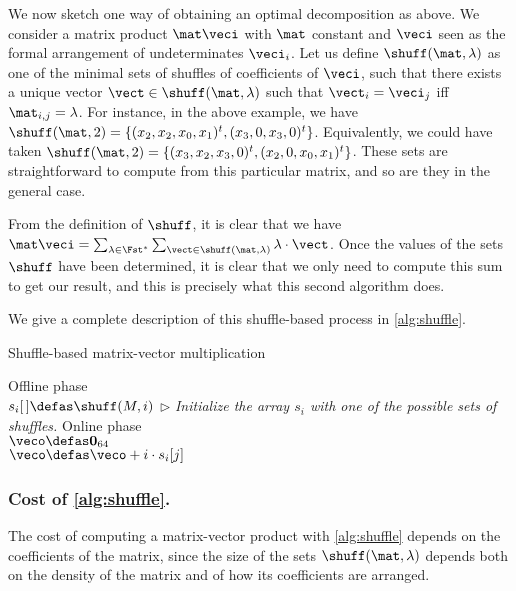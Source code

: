 \medskip

We now sketch one way of obtaining an optimal decomposition as above.
We consider a matrix product $\mat\veci$ with $\mat$ constant and $\veci$
seen as the formal arrangement of undeterminates $\veci_i$.
Let us define $\shuff(\mat, \lambda)$ as one of the minimal sets of shuffles of coefficients of $\veci$, such that
there exists a unique vector $\vect \in \shuff(\mat, \lambda)$ such that $\vect_i = \veci_j$ iff $\mat_{i,j} = \lambda$.
For instance, in the above example, we have $\shuff(\mat,2) = \{(x_2,x_2,x_0,x_1)^t, (x_3,0,x_3,0)^t\}$. Equivalently, we could have taken
$\shuff(\mat, 2) = \{(x_3,x_2,x_3,0)^t, (x_2,0,x_0,x_1)^t\}$.
These sets are straightforward to compute from this particular matrix, and so are they in the general case.

From the definition of $\shuff$, it is clear that we have $\mat\veci = \sum_{\lambda \in \Fst^*}\sum_{\vect \in \shuff(\mat,\lambda)} \lambda\cdot \vect$.
Once the values of the sets $\shuff$ have been determined, it is clear that we only need to compute this sum to get our result, and 
this is precisely what this second algorithm does.

We give a complete description of this shuffle-based process in \autoref{alg:shuffle}.

\begin{algorithm}[!h]
  \caption{Shuffle-based matrix-vector multiplication}
\label{alg:shuffle}
  \LinesNumbered
  \KwOut{  $\veco = \mat\cdot\veci$}
  Offline phase\\
  {
  $s_i[\,] \defas \shuff(M, i)$ $\triangleright$ \emph{Initialize the array $s_i$ with one of the possible sets of shuffles.}
  }
  Online phase\\
  $\veco \defas \mathbf{0}_{64}$\\
  {
  {
  $\veco \defas \veco + i\cdot s_i[j]$
  }
  }
  \Return{$\veco$}
\end{algorithm}

\subsubsection{Cost of \autoref{alg:shuffle}.} The cost of computing a matrix-vector product with \autoref{alg:shuffle} depends
on the coefficients of the matrix, since the size of the sets $\shuff(\mat, \lambda)$ depends both on the density
of the matrix and of how its coefficients are arranged.

